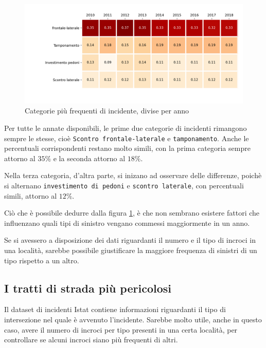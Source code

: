 \documentclass[a4paper,12pt]{report}
\newcommand{\columnstyle}[1]{\texttt{#1}}
\begin{document}
\begin{figure}
    \includegraphics[width=\linewidth]{../src/incidenti/incidenti_senza_coords/localizzazione_incidente/rapporto_tipologie.png}
    \caption{Categorie più frequenti di incidente, divise per anno}
    \label{fig:rapporto-tipologie}
\end{figure}

Per tutte le annate disponibili, le prime due categorie di incidenti rimangono sempre 
le stesse, cioè \columnstyle{Scontro frontale-laterale} e \columnstyle{tamponamento}. 
Anche le percentuali corrispondenti restano molto simili, con la prima 
categoria sempre attorno al $35\%$ e la seconda attorno al $18\%$.

Nella terza categoria, d'altra parte, si inizano ad osservare delle differenze, 
poichè si alternano \columnstyle{investimento di pedoni} e \columnstyle{scontro laterale}, 
con percentuali simili, attorno al $12\%$.

Ciò che è possibile dedurre dalla figura \ref{fig:rapporto-tipologie}, è che non 
sembrano esistere fattori che influenzano quali tipi di sinistro 
vengano commessi maggiormente in un anno. 

Se si avessero a disposizione dei dati riguardanti il numero e il tipo 
di incroci in una località, sarebbe possibile giustificare 
la maggiore frequenza di sinistri di un tipo rispetto a un altro. 

\subsection{I tratti di strada più pericolosi}

Il dataset di incidenti Istat contiene informazioni riguardanti il tipo di 
intersezione nel quale è avvenuto l'incidente.
Sarebbe molto utile, anche in questo caso, avere il numero di incroci per tipo 
presenti in una certa località, per controllare se alcuni incroci siano più 
frequenti di altri.
\end{document}

